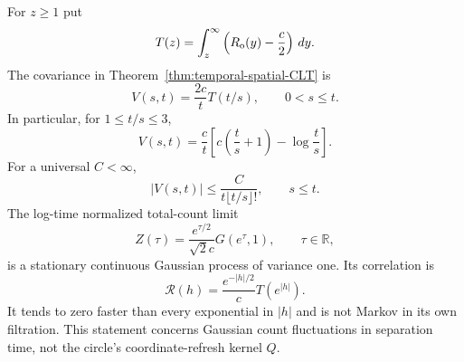 \documentclass[11pt,letterpaper]{article}
\begin{document}
\begin{corollary}
\label{cor:explicit-temporal-kernel}
For $z\ge1$ put
\[
 T(z)=\int_z^\infty\left(R_{\rm o}(y)-\frac c2\right)\,dy.
\]
The covariance in Theorem~\ref{thm:temporal-spatial-CLT} is
\begin{equation}\label{eq:explicit-temporal-kernel}
 V(s,t)=\frac{2c}{t}T(t/s),\qquad 0<s\le t.
\end{equation}
In particular, for $1\le t/s\le3$,
\begin{equation}\label{eq:short-ratio-temporal-kernel}
 V(s,t)=\frac c t\left[c\left(\frac ts+1\right)
                                      -\log\frac ts\right].
\end{equation}
For a universal $C<\infty$,
\begin{equation}\label{eq:factorial-temporal-decorrelation}
 |V(s,t)|\le\frac C{t\lfloor t/s\rfloor!},\qquad s\le t.
\end{equation}
The log-time normalized total-count limit
\[
 Z(\tau)=\frac{e^{\tau/2}}{\sqrt2c}G(e^\tau,1),
                    \qquad \tau\in\mathbb R,
\]
is a stationary continuous Gaussian process of variance one.
Its correlation is
\begin{equation}\label{eq:log-time-count-correlation}
 \mathcal R(h)=\frac{e^{-|h|/2}}cT(e^{|h|}).
\end{equation}
It tends to zero faster than every exponential in $|h|$ and
is not Markov in its own filtration. This statement concerns
Gaussian count fluctuations in separation time, not the
circle's coordinate-refresh kernel $Q$.
\end{corollary}
\end{document}
